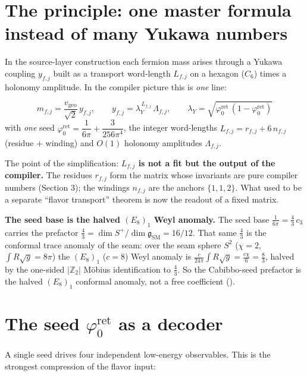 \documentclass[11pt,a4paper]{article}
\newcommand{\phiz}{\varphi_0^{\mathrm{ret}}}
\newcommand{\Z}{\mathbb{Z}}
\newcommand{\lamY}{\lambda_Y}
\newcommand{\vgeo}{v_{\mathrm{geo}}}
\theoremstyle{definition}
\begin{document}
\section{The principle: one master formula instead of many Yukawa numbers}
In the source-layer construction each fermion mass arises through a Yukawa coupling $y_{f,j}$ built as a transport
word-length $L_{f,j}$ on a hexagon ($C_6$) times a holonomy amplitude. In the compiler picture this is
\emph{one} line:

\begin{keybox}
\[
  \boxed{\ \hat m_{f,j}=\frac{\vgeo}{\sqrt2}\,y_{f,j},\qquad
  y_{f,j}=\lamY^{\,L_{f,j}}\,\Lambda_{f,j},\qquad
  \lamY=\sqrt{\phiz\,(1-\phiz)}\ }
\]
with \emph{one} seed $\phiz=\dfrac{1}{6\pi}+\dfrac{3}{256\pi^4}$, the integer word-lengths
$L_{f,j}=r_{f,j}+6\,n_{f,j}$ (residue $+$ winding) and $O(1)$ holonomy amplitudes $\Lambda_{f,j}$.
\end{keybox}

\noindent The point of the simplification: \textbf{$L_{f,j}$ is not a fit but the output of the
compiler.} The residues $r_{f,j}$ form the matrix whose invariants are pure compiler numbers
(Section 3); the windings $n_{f,j}$ are the anchors $\{1,1,2\}$. What used to be a separate ``flavor
transport'' theorem is now the readout of a fixed matrix.

\noindent\textbf{The seed base is the halved $(E_8)_1$ Weyl anomaly.} The seed base
$\tfrac1{6\pi}=\tfrac43\,c_3$ carries the prefactor $\tfrac43=\dim S^+/\dim\mathfrak g_{\mathrm{SM}}=16/12$.
That same $\tfrac43$ is the conformal trace anomaly of the seam: over the seam sphere
$S^2$ ($\chi=2$, $\int R\sqrt g=8\pi$) the $(E_8)_1$ ($c=8$) Weyl anomaly is
$\tfrac{c}{24\pi}\!\int\! R\sqrt g=\tfrac{c\chi}{6}=\tfrac83$, halved by the one-sided
$|\Z_2|$ M\"obius identification to $\tfrac43$. So the Cabibbo-seed prefactor is the halved
$(E_8)_1$ conformal anomaly, not a free coefficient ().

\section{The seed $\phiz$ as a decoder}
A single seed drives four independent low-energy observables. This is the strongest compression of the
flavor input:
\end{document}
